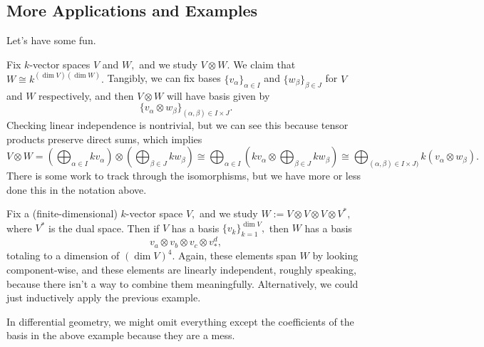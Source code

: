 \subsection{More Applications and Examples}
Let's have some fun.
\begin{example}
	Fix $k$-vector spaces $V$ and $W,$ and we study $V\otimes W.$ We claim that $W\cong k^{(\dim V)(\dim W)}.$ Tangibly, we can fix bases $\{v_\alpha\}_{\alpha\in I}$ and $\{w_\beta\}_{\beta\in J}$ for $V$ and $W$ respectively, and then $V\otimes W$ will have basis given by
	\[\{v_\alpha\otimes w_\beta\}_{(\alpha,\beta)\in I\times J}.\]
	Checking linear independence is nontrivial, but we can see this because tensor products preserve direct sums, which implies
	\[V\otimes W=\left(\bigoplus_{\alpha\in I}kv_\alpha\right)\otimes\left(\bigoplus_{\beta\in J}kw_\beta\right)\cong\bigoplus_{\alpha\in I}\left(kv_\alpha\otimes\bigoplus_{\beta\in J}kw_\beta\right)\cong\bigoplus_{(\alpha,\beta)\in I\times J)}k(v_\alpha\otimes w_\beta).\]
	There is some work to track through the isomorphisms, but we have more or less done this in the notation above.
\end{example}
\begin{example}
	Fix a (finite-dimensional) $k$-vector space $V,$ and we study $W:=V\otimes V\otimes V\otimes V^*,$ where $V^*$ is the dual space. Then if $V$ has a basis $\{v_k\}_{k=1}^{\dim V},$ then $W$ has a basis
	\[v_a\otimes v_b\otimes v_c\otimes v_*^d,\]
	totaling to a dimension of $(\dim V)^4.$ Again, these elements span $W$ by looking component-wise, and these elements are linearly independent, roughly speaking, because there isn't a way to combine them meaningfully. Alternatively, we could just inductively apply the previous example.
\end{example}
In differential geometry, we might omit everything except the coefficients of the basis in the above example because they are a mess.

